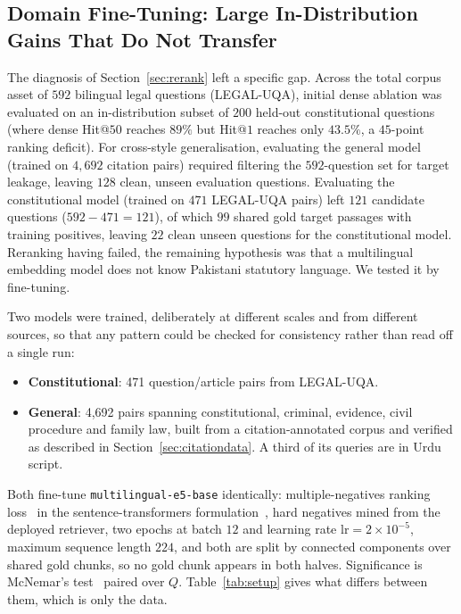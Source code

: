 \documentclass[conference]{IEEEtran}
\begin{document}
\subsection{Domain Fine-Tuning: Large In-Distribution Gains That Do Not Transfer}
\label{sec:finetune}
The diagnosis of Section~\ref{sec:rerank} left a specific gap. Across the total corpus asset
of $592$ bilingual legal questions (LEGAL-UQA), initial dense ablation was evaluated
on an in-distribution subset of $200$ held-out constitutional questions (where dense
Hit@$50$ reaches $89\%$ but Hit@$1$ reaches only $43.5\%$, a $45$-point ranking
deficit). For cross-style generalisation, evaluating the general model (trained on
$4{,}692$ citation pairs) required filtering the $592$-question set for target leakage,
leaving $128$ clean, unseen evaluation questions. Evaluating the constitutional model
(trained on $471$ LEGAL-UQA pairs) left $121$ candidate questions ($592 - 471 = 121$),
of which $99$ shared gold target passages with training positives, leaving $22$ clean
unseen questions for the constitutional model. Reranking having failed, the remaining
hypothesis was that a multilingual embedding model does not know Pakistani statutory
language. We tested it by fine-tuning.

Two models were trained, deliberately at different scales and from different
sources, so that any pattern could be checked for consistency rather than read
off a single run:

\begin{itemize}
\item \textbf{Constitutional}: 471 question/article pairs from LEGAL-UQA.
\item \textbf{General}: 4{,}692 pairs spanning constitutional, criminal,
evidence, civil procedure and family law, built from a citation-annotated corpus
and verified as described in Section~\ref{sec:citationdata}. A third of its
queries are in Urdu script.
\end{itemize}

Both fine-tune \texttt{multilingual-e5-base} identically: multiple-negatives
ranking loss~\cite{henderson2017mnrl} in the sentence-transformers
formulation~\cite{reimers2019sbert}, hard negatives mined from the deployed
retriever, two epochs at batch $12$ and learning rate $\text{lr} = 2\times10^{-5}$, maximum
sequence length $224$, and both are split by connected components over shared
gold chunks, so no gold chunk appears in both halves. Significance is McNemar's
test~\cite{mcnemar1947} paired over $Q$.
Table~\ref{tab:setup} gives what differs between them, which is only the data.
\end{document}
